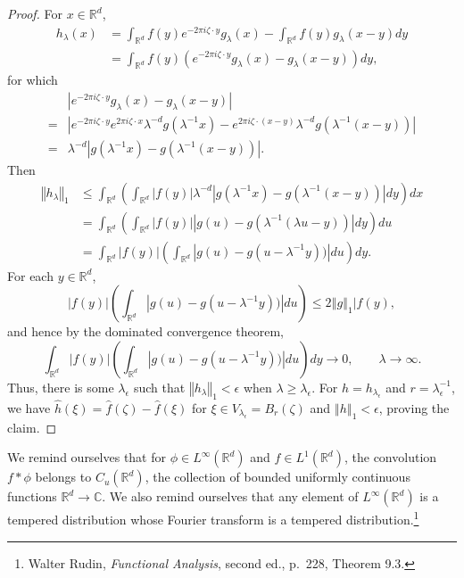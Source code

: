\documentclass{article}
\newcommand{\norm}[1]{\left\Vert #1 \right\Vert}
\theoremstyle{definition}
\begin{document}
\begin{proof}
For $x \in \mathbb{R}^d$,
\begin{align*}
h_\lambda(x)&=\int_{\mathbb{R}^d} f(y) e^{-2\pi i\zeta \cdot y} g_\lambda(x)
-\int_{\mathbb{R}^d} f(y) g_\lambda(x-y) dy\\
&=\int_{\mathbb{R}^d} f(y) \left( e^{-2\pi i\zeta \cdot y} g_\lambda(x)-g_\lambda(x-y) \right) dy,
\end{align*}
for which
\[
\begin{split}
&\left| e^{-2\pi i\zeta \cdot y} g_\lambda(x)-g_\lambda(x-y) \right|\\
=&\left| e^{-2\pi i\zeta \cdot y} e^{2\pi i\zeta \cdot x}
\lambda^{-d} g(\lambda^{-1} x) - e^{2\pi i\zeta\cdot (x-y)} \lambda^{-d} g(\lambda^{-1}(x-y)) \right|\\
=&\lambda^{-d} | g(\lambda^{-1}x)-g(\lambda^{-1}(x-y))|.
\end{split}
\]
Then
\begin{align*}
\norm{h_\lambda}_1&\leq \int_{\mathbb{R}^d} \left(   \int_{\mathbb{R}^d} |f(y)| \lambda^{-d} | g(\lambda^{-1}x)-g(\lambda^{-1}(x-y))|
dy \right) dx\\
&=\int_{\mathbb{R}^d} \left(  \int_{\mathbb{R}^d} |f(y)| |g(u)-g(\lambda^{-1}(\lambda u-y))| dy \right) du\\
&=\int_{\mathbb{R}^d} |f(y)| \left(  \int_{\mathbb{R}^d} |g(u)-g(u-\lambda^{-1} y))|  du \right) dy.
\end{align*}
For each $y \in \mathbb{R}^d$, 
\[
|f(y)| \left(  \int_{\mathbb{R}^d} |g(u)-g(u-\lambda^{-1} y))|  du \right) \leq 2 \norm{g}_1 |f(y),
\]
and hence by the dominated convergence theorem,
\[
\int_{\mathbb{R}^d} |f(y)| \left(  \int_{\mathbb{R}^d} |g(u)-g(u-\lambda^{-1} y))|  du \right) dy \to
0, \qquad \lambda \to \infty.
\]
Thus, there is some $\lambda_\epsilon$ such that $\norm{h_\lambda}_1 < \epsilon$ when
$\lambda \geq \lambda_\epsilon$.
For $h=h_{\lambda_\epsilon}$ and $r=\lambda_\epsilon^{-1}$, we have
$\hat{h}(\xi) = \hat{f}(\zeta)-\hat{f}(\xi)$ for $\xi \in V_{\lambda_\epsilon} = B_r(\zeta)$ and 
$\norm{h}_1<\epsilon$, proving the claim.
\end{proof}

We remind ourselves that for $\phi \in L^\infty(\mathbb{R}^d)$ and $f \in L^1(\mathbb{R}^d)$, the convolution
$f*\phi$ belongs to $C_u(\mathbb{R}^d)$, the collection of bounded uniformly continuous functions $\mathbb{R}^d \to \mathbb{C}$.
We also remind ourselves that any element of $L^\infty(\mathbb{R}^d)$  is a tempered distribution whose  Fourier
transform is a tempered distribution.\footnote{Walter Rudin, {\em Functional Analysis}, second ed.,
p.~228, Theorem 9.3.}
\end{document}
